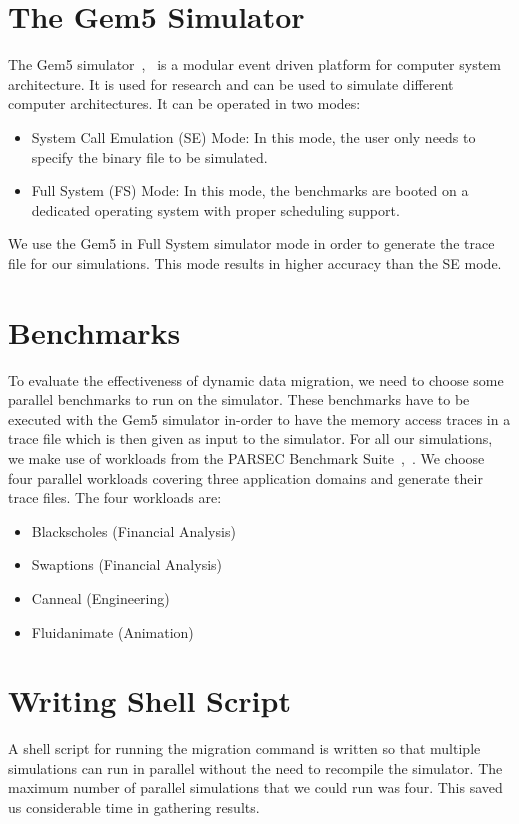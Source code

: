 \documentclass{listhesis}
\begin{document}
\section{The Gem5 Simulator}
The Gem5 simulator~\cite{gem5},~\cite{akshay} is a modular event driven platform for computer system architecture. It is used for research and can be used to simulate different computer architectures. It can be operated in two modes:
\begin{itemize}
\item System Call Emulation (SE) Mode: In this mode, the user only needs to specify the binary file to be simulated.
\item Full System (FS) Mode: In this mode, the benchmarks are booted on a dedicated operating system with proper scheduling support. 
\end{itemize}
 We use the Gem5 in Full System simulator mode in order to generate the trace file for our simulations. This mode results in higher accuracy than the SE mode.
\section{Benchmarks}
To evaluate the effectiveness of dynamic data migration, we need to choose some parallel benchmarks to run on the simulator. These benchmarks have to be executed with the Gem5 simulator in-order to have the memory access traces in a trace file which is then given as input to the simulator. For all our simulations, we make use of workloads from the PARSEC Benchmark Suite~\cite{lispaper},~\cite{trace}. We choose four parallel workloads covering three application domains and generate their trace files. The four workloads are: 
\begin{itemize}
\item Blackscholes (Financial Analysis)
\item Swaptions (Financial Analysis)
\item Canneal (Engineering)
\item Fluidanimate (Animation)
\end{itemize}
\section{Writing Shell Script}
A shell script for running the migration command is written so that multiple simulations can run in parallel without the need to recompile the simulator. The maximum number of parallel simulations that we could run was four. This saved us considerable time in gathering results. 
\end{document}

